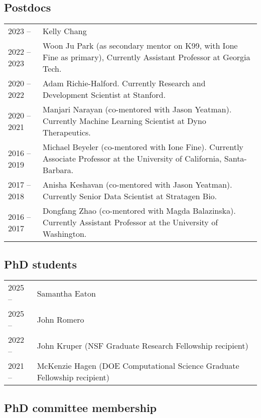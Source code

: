 \documentclass[11pt,fullpage]{article}
\begin{document}
\subsection*{Postdocs}
\begin{tabular}{p{}p{}}
2023 -- & Kelly Chang \\
2022 -- 2023 & Woon Ju Park (as secondary mentor on K99, with Ione Fine as primary), Currently Assistant Professor at Georgia Tech.\\
2020 -- 2022 & Adam Richie-Halford. Currently Research and Development Scientist at Stanford. \\
2020 -- 2021 & Manjari Narayan (co-mentored with Jason Yeatman). Currently Machine Learning Scientist at Dyno Therapeutics.\\
2016 -- 2019 & Michael Beyeler (co-mentored  with Ione Fine). Currently Associate Professor at the University of California, Santa-Barbara.\\
2017 -- 2018 & Anisha Keshavan (co-mentored  with Jason Yeatman). Currently Senior Data Scientist at Stratagen Bio. \\
2016 -- 2017 & Dongfang Zhao (co-mentored with Magda Balazinska). Currently Assistant Professor at the University of Washington.
\end{tabular}

\subsection*{PhD students}

\begin{tabular}{p{}p{}}
2025 --  & Samantha Eaton \\
2025 --  & John Romero \\
2022 --  & John Kruper (NSF Graduate Research Fellowship recipient)\\
2021 --  &  McKenzie Hagen (DOE Computational Science Graduate Fellowship recipient)\\
\end{tabular}

\subsection*{PhD committee membership}
\end{document}

